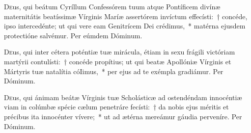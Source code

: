 \documentclass[vesperale_romanum.tex]{subfiles}
\begin{document}

\myrule


\duplexmtv


\oratio

 \lettrine{D}{e}us, qui beátum Cyríllum Confessórem tuum atque Pontíficem divínæ maternitátis beatíssimæ Vírginis Maríæ assertórem inví\-ctum effecísti:~† concéde, i\-pso intercedénte; ut qui vere eam Genitrícem Dei crédimus,~* matérna ejusdem prote\-ctióne salvémur.
Per eúmdem Dóminum.



\oratio

\lettrine{D}{e}us, qui inter cétera poténtiæ tuæ mirácula, étiam in sexu frágili vi\-ctóriam martýrii contulísti:~† concéde propítius; ut qui beatæ Apollóniæ Vírginis et Mártyris tuæ natalítia cóIimus,~* per ejus ad te exémpla gradiámur. Per Dóminum.

\capitdeseqquad

\myrule


\duplex

\oratio

\lettrine{D}{e}us, qui  ánimam beátæ Vírginis tuæ Scholásticæ ad ostendéndam innocéntiæ viam in colúmbæ spécie cælum penetráre fecísti:~† da nobis ejus méritis et précibus ita innocénter vívere;~* ut ad ætérna mereámur gáudia perveníre.
Per Dóminum.



\myrule

\end{document}
